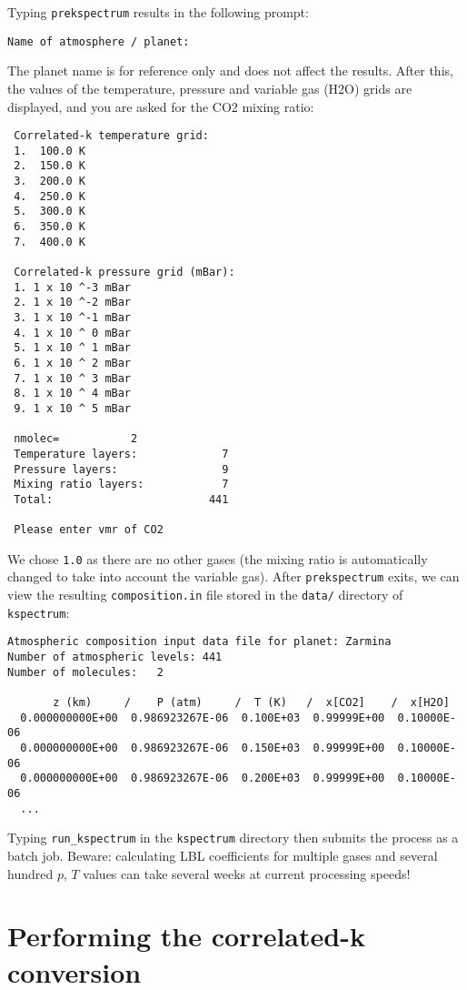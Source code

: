 Typing {\tt prekspectrum} results in the following prompt:

\begin{verbatim}
Name of atmosphere / planet:
\end{verbatim}

The planet name is for reference only and does not affect the results. After this, the values of the temperature, pressure and variable gas (H2O) grids are displayed, and you are asked for the CO2 mixing ratio:

\begin{verbatim}
 Correlated-k temperature grid:
 1.  100.0 K
 2.  150.0 K
 3.  200.0 K
 4.  250.0 K
 5.  300.0 K
 6.  350.0 K
 7.  400.0 K

 Correlated-k pressure grid (mBar):
 1. 1 x 10 ^-3 mBar
 2. 1 x 10 ^-2 mBar
 3. 1 x 10 ^-1 mBar
 4. 1 x 10 ^ 0 mBar
 5. 1 x 10 ^ 1 mBar
 6. 1 x 10 ^ 2 mBar
 7. 1 x 10 ^ 3 mBar
 8. 1 x 10 ^ 4 mBar
 9. 1 x 10 ^ 5 mBar

 nmolec=           2
 Temperature layers:             7
 Pressure layers:                9
 Mixing ratio layers:            7
 Total:                        441

 Please enter vmr of CO2
\end{verbatim}

We chose {\tt 1.0} as there are no other gases (the mixing ratio is automatically changed to take into account the variable gas). After {\tt prekspectrum} exits, we can view the resulting \verb+composition.in+ file stored in the \verb+data/+ directory of \verb+kspectrum+:

\begin{verbatim}
Atmospheric composition input data file for planet: Zarmina
Number of atmospheric levels: 441
Number of molecules:   2

       z (km)     /    P (atm)     /  T (K)   /  x[CO2]    /  x[H2O]
  0.000000000E+00  0.986923267E-06  0.100E+03  0.99999E+00  0.10000E-06
  0.000000000E+00  0.986923267E-06  0.150E+03  0.99999E+00  0.10000E-06
  0.000000000E+00  0.986923267E-06  0.200E+03  0.99999E+00  0.10000E-06
  ...
\end{verbatim}

Typing \verb+run_kspectrum+ in the \verb+kspectrum+ directory then submits the process as a batch job. Beware: calculating LBL coefficients for multiple gases and several hundred $p$, $T$ values can take several weeks at current processing speeds!

\section{Performing the correlated-k conversion}

